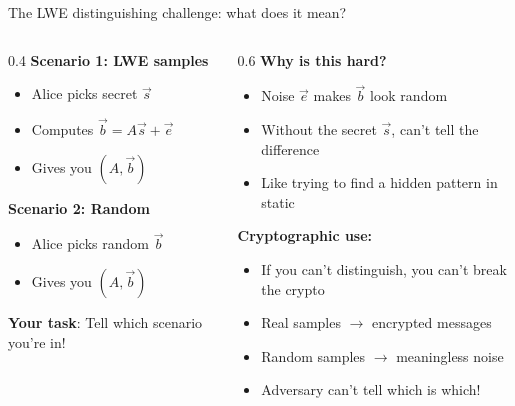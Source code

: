 \ifdefined\PRESENTATION\else\PassOptionsToClass{handout}{beamer}\fi\documentclass[aspectratio=169, lualatex]{beamer}
\begin{document}
\begin{frame}{The LWE distinguishing challenge: what does it mean?}
	\begin{columns}[c]
		\begin{column}{0.4\textwidth}
			\textbf{Scenario 1: LWE samples}
			\begin{itemize}
				\item Alice picks secret $\vec{s}$
				\item Computes $\vec{b} = A\vec{s} + \vec{e}$
				\item Gives you $(A, \vec{b})$
			\end{itemize}
			\textbf{Scenario 2: Random}
			\begin{itemize}
				\item Alice picks random $\vec{b}$
				\item Gives you $(A, \vec{b})$
			\end{itemize}
			\textbf{Your task}: Tell which scenario you're in!
		\end{column}
		\begin{column}{0.6\textwidth}
			\textbf{Why is this hard?}
			\begin{itemize}
				\item Noise $\vec{e}$ makes $\vec{b}$ look random
				\item Without the secret $\vec{s}$, can't tell the difference
				\item Like trying to find a hidden pattern in static
			\end{itemize}
			\textbf{Cryptographic use:}
			\begin{itemize}
				\item If you can't distinguish, you can't break the crypto
				\item Real samples $\rightarrow$ encrypted messages
				\item Random samples $\rightarrow$ meaningless noise
				\item Adversary can't tell which is which!
			\end{itemize}
		\end{column}
	\end{columns}
\end{frame}
\end{document}
